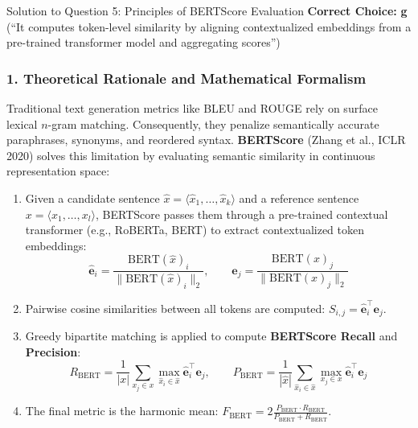 \documentclass[11pt,a4paper]{article}
\begin{document}
\begin{solutionbox}{Solution to Question 5: Principles of BERTScore Evaluation}
\textbf{Correct Choice:} \textbf{g} (``It computes token-level similarity by aligning contextualized embeddings from a pre-trained transformer model and aggregating scores'')

\subsubsection*{1. Theoretical Rationale and Mathematical Formalism}
Traditional text generation metrics like BLEU and ROUGE rely on surface lexical $n$-gram matching. Consequently, they penalize semantically accurate paraphrases, synonyms, and reordered syntax. \textbf{BERTScore} (Zhang et al., ICLR 2020) solves this limitation by evaluating semantic similarity in continuous representation space:
\begin{enumerate}
    \item Given a candidate sentence $\hat{x} = \langle \hat{x}_1, \dots, \hat{x}_k \rangle$ and a reference sentence $x = \langle x_1, \dots, x_l \rangle$, BERTScore passes them through a pre-trained contextual transformer (e.g., RoBERTa, BERT) to extract contextualized token embeddings:
    \begin{equation}
        \mathbf{\hat{e}}_i = \frac{\text{BERT}(\hat{x})_i}{\|\text{BERT}(\hat{x})_i\|_2}, \qquad \mathbf{e}_j = \frac{\text{BERT}(x)_j}{\|\text{BERT}(x)_j\|_2}
    \end{equation}
    \item Pairwise cosine similarities between all tokens are computed: $S_{i,j} = \mathbf{\hat{e}}_i^\top \mathbf{e}_j$.
    \item Greedy bipartite matching is applied to compute \textbf{BERTScore Recall} and \textbf{Precision}:
    \begin{equation}
        R_{\text{BERT}} = \frac{1}{|x|} \sum_{x_j \in x} \max_{\hat{x}_i \in \hat{x}} \mathbf{\hat{e}}_i^\top \mathbf{e}_j, \qquad P_{\text{BERT}} = \frac{1}{|\hat{x}|} \sum_{\hat{x}_i \in \hat{x}} \max_{x_j \in x} \mathbf{\hat{e}}_i^\top \mathbf{e}_j
    \end{equation}
    \item The final metric is the harmonic mean: $F_{\text{BERT}} = 2 \frac{P_{\text{BERT}} \cdot R_{\text{BERT}}}{P_{\text{BERT}} + R_{\text{BERT}}}$.
\end{enumerate}


\end{solutionbox}
\end{document}
